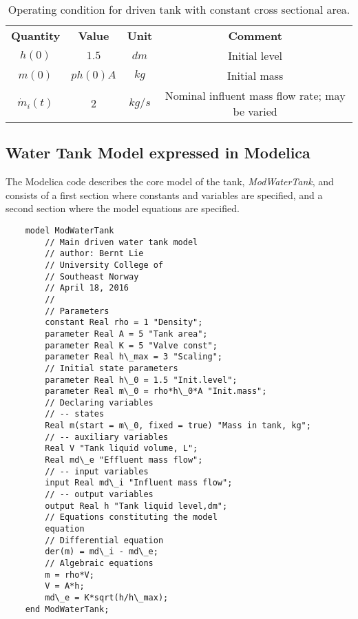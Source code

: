 \begin{table}
	\begin{center}
		\caption{Operating condition for driven tank with constant cross sectional area.} 
		\label{tab:tablemodeloperatingconditions} 
		\begin{tabular}{ cccc } 
			\hline
			\bfseries Quantity & \bfseries Value  & \bfseries Unit  & \bfseries Comment \\ 
			$h(0)$ & $1.5$ & $dm $ & Initial level \\ 
			$m(0)$ & $ph (0) A $ & $kg$ & Initial mass \\ 
			$\dot{m}_i (t)$ & $2$ & $kg/s$ & Nominal influent mass flow rate; may be varied \\
			\hline
		\end{tabular}
	\end{center}
\end{table}

\subsection{Water Tank Model expressed in Modelica}
\label{subsec:pythonmodleicamodel}

The Modelica code describes the core model of the tank, \textit{ModWaterTank}, and consists of a first section where
constants and variables are specified, and a second section where the model equations are specified.

\begin{lstlisting}
	model ModWaterTank 
		// Main driven water tank model 
		// author: Bernt Lie 
		// University College of 
		// Southeast Norway 
		// April 18, 2016 
		//
		// Parameters
		constant Real rho = 1 "Density";
		parameter Real A = 5 "Tank area";
		parameter Real K = 5 "Valve const";
		parameter Real h\_max = 3 "Scaling";
		// Initial state parameters
		parameter Real h\_0 = 1.5 "Init.level";
		parameter Real m\_0 = rho*h\_0*A "Init.mass";
		// Declaring variables
		// -- states
		Real m(start = m\_0, fixed = true) "Mass in tank, kg";
		// -- auxiliary variables
		Real V "Tank liquid volume, L";
		Real md\_e "Effluent mass flow";
		// -- input variables
		input Real md\_i "Influent mass flow";
		// -- output variables 
		output Real h "Tank liquid level,dm";
		// Equations constituting the model 
		equation 
		// Differential equation 
		der(m) = md\_i - md\_e; 
		// Algebraic equations 
		m = rho*V; 
		V = A*h;
		md\_e = K*sqrt(h/h\_max);
	end ModWaterTank;
\end{lstlisting}

